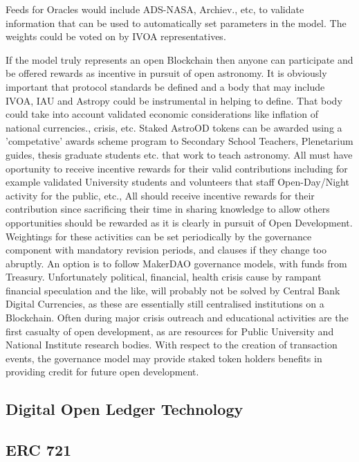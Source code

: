 \documentclass[final,5p,times,twocolumn,authoryear]{elsarticle}
\begin{document}
Feeds for Oracles would include ADS-NASA, Archiev., etc,  to validate information that can be used to automatically set parameters in the model. The weights could be voted on by IVOA representatives.

If the  model truly represents an open Blockchain then anyone can participate and be offered rewards as incentive in pursuit of open astronomy. It is obviously important that protocol standards be defined and a body that may include IVOA, IAU and Astropy could be instrumental in helping to define. That body could take into account validated economic considerations like inflation of national currencies., crisis, etc. Staked AstroOD tokens can be awarded using a 'competative' awards scheme program to Secondary School Teachers, Plenetarium guides, thesis graduate students etc. that work to teach astronomy. All must have oportunity to receive incentive rewards for their valid contributions including for example validated University students and volunteers that staff Open-Day/Night activity for the public, etc., All should receive incentive rewards for their contribution since sacrificing their time in sharing knowledge to allow others opportunities should be rewarded as it is clearly in pursuit of Open Development. Weightings for these activities can be set periodically by the governance component with mandatory revision periods, and clauses if they change too abruptly. An option is to follow MakerDAO governance models, with funds from Treasury. Unfortunately political, financial, health  crisis cause by rampant financial speculation and the like, will probably not be solved by Central Bank Digital Currencies, as these are essentially still centralised institutions on a Blockchain.  Often during major crisis outreach and educational activities are the first casualty of open development, as are resources for Public University and National Institute research bodies. With respect to the creation of transaction events, the governance model may provide staked token holders benefits in providing credit for future open development. 

\subsection{Digital Open Ledger Technology}

\subsection{ERC 721 }
\end{document}
